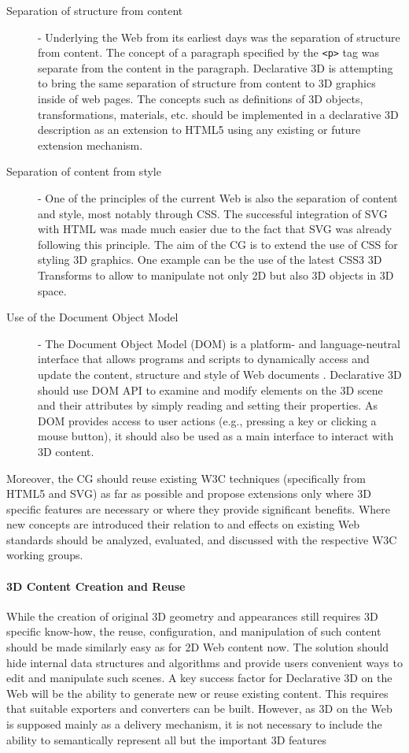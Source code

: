 \documentclass[review]{acmsiggraph}
\begin{document}
\begin{description}
  \item [Separation of structure from content] - Underlying the Web from its earliest days was the separation of structure from content. The concept of a paragraph specified by the \verb|<p>| tag was separate from the content in the paragraph. Declarative 3D is attempting to bring the same separation of structure from content to 3D graphics inside of web pages. The concepts such as definitions of 3D objects, transformations, materials, etc. should be implemented in a declarative 3D description as an extension to HTML5 using any existing or future extension mechanism.
  \item [Separation of content from style] - One of the principles of the current Web is also the separation of content and style, most notably through CSS. The successful integration of SVG with HTML was made much easier due to the fact that SVG was already following this principle.
      The aim of the CG is to extend the use of CSS for styling 3D graphics. One example can be the use of the latest CSS3 3D Transforms to allow to manipulate not only 2D but also 3D objects in 3D space.
  \item [Use of the Document Object Model] - The Document Object Model (DOM) is a platform- and language-neutral interface that allows programs and scripts to dynamically access and update the content, structure and style of Web documents \cite{W3C-DOM}. Declarative 3D should use DOM API to examine and modify elements on the 3D scene and their attributes by simply reading and setting their properties.
      As DOM provides access to user actions (e.g., pressing a key or clicking a mouse button), it should also be used as a main interface to interact with 3D content.
\end{description}

Moreover, the CG should reuse existing W3C techniques (specifically from HTML5 and SVG) as far as possible and propose extensions only where 3D specific features are necessary or where they provide significant benefits. Where new concepts are introduced their relation to and effects on existing Web standards should be analyzed, evaluated, and discussed with the respective W3C working groups.

\paragraph{3D Content Creation and Reuse}
While the creation of original 3D geometry and appearances still requires 3D specific know-how, the reuse, configuration, and manipulation of such content should be made similarly easy as for 2D Web content now. The solution should hide internal data structures and algorithms and provide users convenient ways to edit and manipulate such scenes.
A key success factor for Declarative 3D on the Web will be the ability to generate new or reuse existing content. This requires that suitable exporters and converters can be built. However, as 3D on the Web is supposed mainly as a delivery mechanism, it is not necessary to include the ability to semantically represent all but the important 3D features
\end{document}

